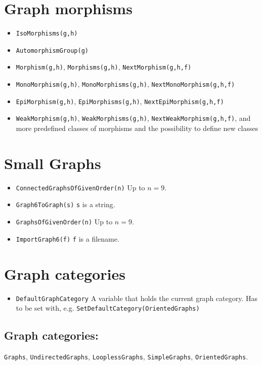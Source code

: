 \documentclass[11pt]{article}
\begin{document}
\begin{multicols}{3}
\section{Graph morphisms}
\label{sec:orgfd8b47d}

\begin{itemize}
\item \texttt{IsoMorphisms(g,h)}
\item \texttt{AutomorphismGroup(g)}
\item \texttt{Morphism(g,h)}, \texttt{Morphisms(g,h)}, \texttt{NextMorphism(g,h,f)}
\item \texttt{MonoMorphism(g,h)}, \texttt{MonoMorphisms(g,h)}, \texttt{NextMonoMorphism(g,h,f)}
\item \texttt{EpiMorphism(g,h)}, \texttt{EpiMorphisms(g,h)}, \texttt{NextEpiMorphism(g,h,f)}
\item \texttt{WeakMorphism(g,h)}, \texttt{WeakMorphisms(g,h)},
\texttt{NextWeakMorphism(g,h,f)}, and more predefined classes of morphisms and the
possibility to define new classes
\end{itemize}

\section{Small Graphs}
\label{sec:org9a84729}

\begin{itemize}
\item \texttt{ConnectedGraphsOfGivenOrder(n)} Up to \(n=9\).
\item \texttt{Graph6ToGraph(s)} \texttt{s} is a string.
\item \texttt{GraphsOfGivenOrder(n)} Up to \(n=9\).
\item \texttt{ImportGraph6(f)} \texttt{f} is a filename.
\end{itemize}

\section{Graph categories}
\label{sec:org80b9746}

\begin{itemize}
\item \texttt{DefaultGraphCategory} A variable that holds the current graph
category. Has to be set with, e.g. \texttt{SetDefaultCategory(OrientedGraphs)}
\end{itemize}

\subsection{Graph categories:}
\label{sec:org21f9056}
\texttt{Graphs}, \texttt{UndirectedGraphs}, \texttt{LooplessGraphs}, \texttt{SimpleGraphs},
\texttt{OrientedGraphs}. 


\end{multicols}
\end{document}
